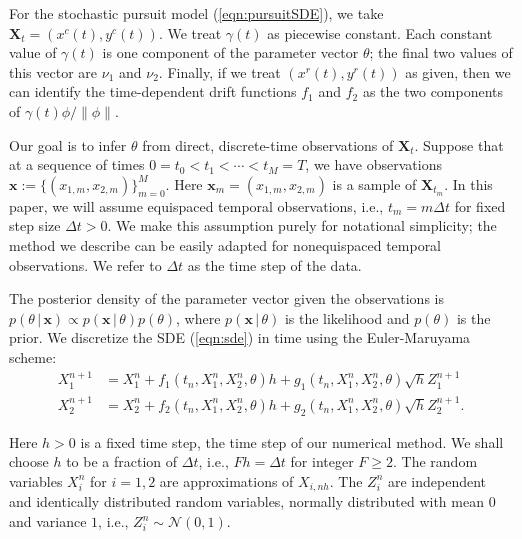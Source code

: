 \documentclass[graybox]{svmult}
\begin{document}
For the stochastic pursuit model (\ref{eqn:pursuitSDE}), we take
$\mathbf{X}_t = (x^{c}(t), y^{c}(t))$.  We treat $\gamma(t)$ as
piecewise constant.  Each constant value of $\gamma(t)$ is one
component of the parameter vector $\theta$; the final two
values of this vector are $\nu_1$ and $\nu_2$.  Finally, if we treat
$(x^{r}(t), y^{r}(t))$ as given, then we can identify the time-dependent drift
functions $f_1$ and $f_2$ as the two components of $ \gamma(t) \phi /
\| \phi \|$. 

Our goal is to infer $\theta$ from direct, discrete-time observations of $\mathbf{X}_t$.  Suppose that at a sequence of times $0 = t_0 < t_1 < \cdots < t_M = T$, we have observations $\mathbf{x} := \{({x}_{1,m},{x}_{2,m})\}_{m=0}^M$.  Here $\mathbf{x}_m = ({x}_{1,m},{x}_{2,m})$ is a sample of $\mathbf{X}_{t_m}$.  In this paper, we will assume equispaced temporal observations, i.e., $t_m = m \Delta t$ for fixed step size $\Delta t > 0$.  We make this assumption purely for notational simplicity; the method we describe can be easily adapted for nonequispaced temporal observations.  We refer to $\Delta t$ as the time step of the data.

The posterior density of the parameter vector given the observations is
$p(\theta \, | \, \mathbf{x})  \propto p( \mathbf{x} \, | \, \theta)  p(\theta)$,
where $p( \mathbf{x} \, | \, \theta)$ is the likelihood and $p(\theta)$ is the prior.  We discretize the SDE (\ref{eqn:sde}) in time using the Euler-Maruyama scheme:
\begin{subequations}
\label{eqn:discretesde}
\begin{align}
X_1^{n+1} &= X_1^{n} + f_1(t_n, X_1^n, X_2^n, \theta)h + g_1(t_n, X_1^n, X_2^n,  \theta) \sqrt{h} Z_1^{n+1} \\
X_2^{n+1} &= X_2^{n} + f_2(t_n, X_1^n, X_2^n,\theta)h + g_2(t_n, X_1^n, X_2^n,\theta) \sqrt{h} Z_2^{n+1}.
\end{align}
\end{subequations}

Here $h > 0$ is a fixed time step, the time step of our numerical method.  We shall choose $h$ to be a fraction of $\Delta t$, i.e., $F h = \Delta t$ for integer $F \geq 2$.  The random variables $X_i^n$ for $i=1,2$ are approximations of $X_{i,n h}$.  The $Z_i^n$ are independent and identically distributed random variables, normally distributed with mean $0$ and variance $1$, i.e., $Z_i^n \sim \mathcal{N}(0,1)$.
\end{document}
